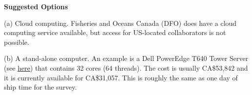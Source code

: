 \documentclass[12pt]{book}\usepackage[]{graphicx}\usepackage[]{color}
\begin{document}
{\bf Suggested Options}

(a) Cloud computing. Fisheries and Oceans Canada (DFO) does have a cloud
computing service available, but access for US-located collaborators is not possible.

(b) A stand-alone computer. An example is a Dell PowerEdge T640 Tower Server
(see \href{http://bit.ly/hake-power-computer}{\underline{here}})
that contains 32 cores (64 threads). The cost is usually CA\$53,842 and it is
currently available for CA\$31,057. This is roughly the same as one day of ship
time for the survey.






\end{document}
